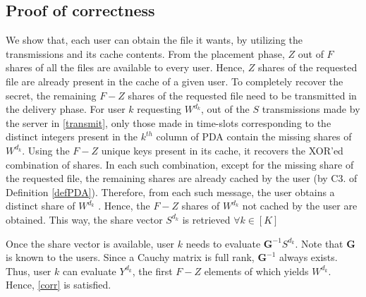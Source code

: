 \documentclass[conference]{IEEEtran}
\begin{document}
\subsection{Proof of correctness} 
We show that, each user can obtain the file it wants, by
utilizing the transmissions and its cache contents. From the placement phase, $Z$ out of $F$ shares of all the files are available to every user. Hence, $Z$ shares of the requested file are already present in the cache of a given user. To completely recover the secret, the remaining $F-Z$ shares of the requested file need
to be transmitted in the delivery phase. For user $k$ requesting $W^{d_k}$, out of the $S$ transmissions made by the server in \eqref{transmit}, only
those made in time-slots corresponding to the distinct integers present in the $k^{th}$ column of PDA contain the missing shares of $W^{d_k}$. Using  the $F-Z$ unique keys present in its cache, it recovers the XOR’ed combination
of shares. In each such combination, except for the missing
share of the requested file, the remaining shares are already
cached by the user (by C3. of Definition \ref{defPDA}). Therefore, from
each such message, the user obtains a distinct share of $W^{d_k}$ .
Hence, the $F-Z$ shares of $W^{d_k}$ not cached by the user are
obtained. This way, the share vector $S^{d_k}$ is retrieved $\forall k\in [K]$
\par Once the share vector is available, user $k$ needs to evaluate $\mathbf{G}^{-1}S^{d_k}$. Note that $\mathbf{G}$ is known to the users. Since a Cauchy matrix is full rank, $\mathbf{G}^{-1}$ always exists. Thus, user $k$ can evaluate $Y^{d_k}$, the first $F-Z$ elements of which yields $W^{d_k}$. Hence, \eqref{corr} is satisfied.
\end{document}
